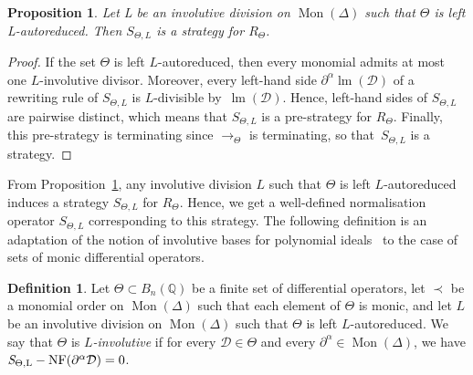 \documentclass[10pt]{easychair}
\newtheorem{proposition}[theorem]{Proposition}
\theoremstyle{definition}
\newtheorem{definition}[theorem]{Definition}
\newcommand\D{\mathcal{D}}
\DeclareMathOperator{\lm}{lm}
\newcommand\Q{\mathbb{Q}}
\newcommand\Weyl[1]{B_{#1}(\Q)}
\newcommand\monBasis{\Mon(\Delta)}
\DeclareMathOperator{\Mon}{Mon}
\newcommand\rewTheta{\to_\Theta}
\newcommand\RTheta{R_{\Theta}}
\newcommand\SThetaL{S_{\Theta,L}}
\DeclareMathOperator{\SThetaLNF}{{\it S}_{\Theta,L}-NF}
\begin{document}
\begin{proposition}\label{prop:involutive_strategy}
  Let L be an involutive division on $\Mon(\Delta)$ such that $\Theta$ is
  left L-autoreduced. Then $\SThetaL$ is a strategy for $\RTheta$.  
\end{proposition}

\begin{proof}
  If the set $\Theta$ is left $L$-autoreduced, then every monomial admits
  at most one $L$-involutive divisor. Moreover, every left-hand side
  $\partial^\alpha\lm(\D)$ of a rewriting rule of $\SThetaL$ is
  $L$-divisible by~$\lm(\D)$. Hence, left-hand sides of $\SThetaL$ are
  pairwise distinct, which means that $\SThetaL$ is a pre-strategy for
  $\RTheta$. Finally, this pre-strategy is terminating since $\rewTheta$
  is terminating, so that~$\SThetaL$ is a strategy.
\end{proof}
\smallskip


From Proposition~\ref{prop:involutive_strategy}, any involutive division
$L$ such that $\Theta$ is left $L$-autoreduced induces a strategy
$\SThetaL$ for $\RTheta$. Hence, we get a well-defined normalisation
operator $\SThetaL$ corresponding to this strategy. The following
definition is an adaptation of the notion of involutive bases for
polynomial ideals~\cite{MR1627129} to the case of sets of monic
differential operators.
\smallskip

\begin{definition}
  Let $\Theta\subset\Weyl{n}$ be a finite set of differential operators,
  let $\prec$ be a monomial order on $\monBasis$ such that each element
  of $\Theta$ is monic, and let $L$ be an involutive division on
  $\Mon(\Delta)$ such that $\Theta$ is left $L$-autoreduced. We say that
  $\Theta$ is {\em $L$-involutive} if for every $\D\in\Theta$ and every
  $\partial^\alpha\in\Mon(\Delta)$, we have
  $\SThetaLNF(\partial^\alpha\D)=0$. 
\end{definition}
\smallskip
\end{document}
